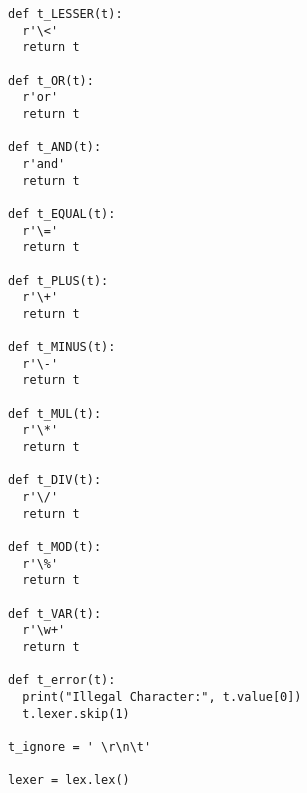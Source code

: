 \documentclass[11pt,a4paper]{report}%
\begin{document}
\begin{scriptsize}
\begin{verbatim}
def t_LESSER(t):
  r'\<'
  return t

def t_OR(t):
  r'or'
  return t

def t_AND(t):
  r'and'
  return t

def t_EQUAL(t):
  r'\='
  return t

def t_PLUS(t):
  r'\+'
  return t

def t_MINUS(t):
  r'\-'
  return t

def t_MUL(t):
  r'\*'
  return t

def t_DIV(t):
  r'\/'
  return t

def t_MOD(t):
  r'\%'
  return t

def t_VAR(t):
  r'\w+'
  return t

def t_error(t):
  print("Illegal Character:", t.value[0])
  t.lexer.skip(1)

t_ignore = ' \r\n\t'

lexer = lex.lex()

\end{verbatim}
\end{scriptsize}
\end{document}
